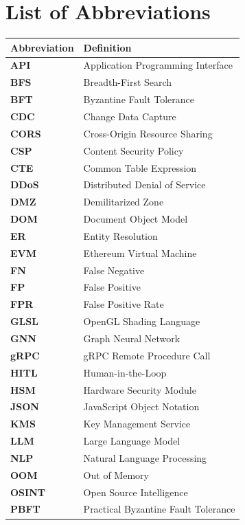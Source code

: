 \chapter*{List of Abbreviations}
\label{ch:abbreviations}

\begin{tabular}{@{}ll@{}}
\textbf{Abbreviation} & \textbf{Definition} \\ \midrule
\textbf{API} & Application Programming Interface \\
\textbf{BFS} & Breadth-First Search \\
\textbf{BFT} & Byzantine Fault Tolerance \\
\textbf{CDC} & Change Data Capture \\
\textbf{CORS} & Cross-Origin Resource Sharing \\
\textbf{CSP} & Content Security Policy \\
\textbf{CTE} & Common Table Expression \\
\textbf{DDoS} & Distributed Denial of Service \\
\textbf{DMZ} & Demilitarized Zone \\
\textbf{DOM} & Document Object Model \\
\textbf{ER} & Entity Resolution \\
\textbf{EVM} & Ethereum Virtual Machine \\
\textbf{FN} & False Negative \\
\textbf{FP} & False Positive \\
\textbf{FPR} & False Positive Rate \\
\textbf{GLSL} & OpenGL Shading Language \\
\textbf{GNN} & Graph Neural Network \\
\textbf{gRPC} & gRPC Remote Procedure Call \\
\textbf{HITL} & Human-in-the-Loop \\
\textbf{HSM} & Hardware Security Module \\
\textbf{JSON} & JavaScript Object Notation \\
\textbf{KMS} & Key Management Service \\
\textbf{LLM} & Large Language Model \\
\textbf{NLP} & Natural Language Processing \\
\textbf{OOM} & Out of Memory \\
\textbf{OSINT} & Open Source Intelligence \\
\textbf{PBFT} & Practical Byzantine Fault Tolerance \\

\end{tabular}
